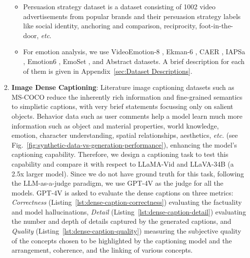 \begin{enumerate}[wide]
\begin{itemize}
            \item Persuasion strategy dataset \cite{bhattacharya2023video} is a dataset consisting of 1002 video advertisements from popular brands and their persuasion strategy labels like social identity, anchoring and comparison, reciprocity, foot-in-the-door, \textit{etc}.



        \item For emotion analysis, we use VideoEmotion-8 \cite{asur2010predicting}, Ekman-6 \cite{xu2016heterogeneous}, CAER \cite{lee2019context}, IAPSa \cite{mikels2005emotional}, Emotion6 \cite{peng2015mixed}, EmoSet \cite{yang2023emoset}, and Abstract \cite{machajdik2010affective} datasets. A brief description for each of them is given in Appendix~\ref{sec:Dataset Descriptions}.

    
        \end{itemize}

    \item \textbf{Image Dense Captioning}: Literature image captioning datasets such as MS-COCO \cite{chen2015microsoft} reduce the inherently rich information and fine-grained semantics to simplistic captions, with very brief statements focussing only on salient objects. Behavior data such as user comments help a model learn much more information such as object and material properties, world knowledge, emotion, character understanding, spatial relationships, aesthetics, \textit{etc.} (see Fig.~\ref{fig:synthetic-data-vs-generation-performance}), enhancing the model's captioning capability. Therefore, we design a captioning task to test this capability and compare it with respect to LLaMA-Vid and LLaVA-34B (a 2.5x larger model). Since we do not have ground truth for this task, following the LLM-as-a-judge paradigm, we use GPT-4V as the judge for all the models. GPT-4V is asked to evaluate the dense captions on three metrics: \textit{Correctness} (Listing~\ref{lst:dense-caption-correctness}) evaluating the factuality and model hallucinations, \textit{Detail} (Listing~\ref{lst:dense-caption-detail}) evaluating the number and depth of details captured by the generated captions, and \textit{Quality} (Listing~\ref{lst:dense-caption-quality}) measuring the subjective quality of the concepts chosen to be highlighted by the captioning model and the arrangement, coherence, and the linking of various concepts.




\end{enumerate}
